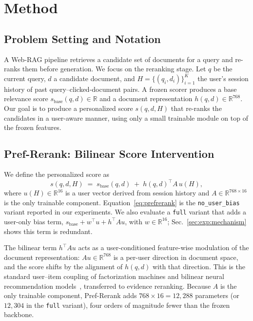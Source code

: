 \section{Method}
\label{sec:method}

\subsection{Problem Setting and Notation}

A Web-RAG pipeline retrieves a candidate set of documents for a query and re-ranks them before generation. We focus on the reranking stage. Let $q$ be the current query, $d$ a candidate document, and $H = \{(q_i, d_i)\}_{i=1}^{K}$ the user's session history of past query--clicked-document pairs. A frozen scorer produces a base relevance score $s_{\mathrm{base}}(q,d) \in \mathbb{R}$ and a document representation $h(q,d) \in \mathbb{R}^{768}$. Our goal is to produce a personalized score $s(q,d,H)$ that re-ranks the candidates in a user-aware manner, using only a small trainable module on top of the frozen features.

\subsection{Pref-Rerank: Bilinear Score Intervention}
\label{sec:method:intervention}

We define the personalized score as
\begin{equation}
\label{eq:prefrerank}
s(q,d,H) \;=\; s_{\mathrm{base}}(q,d) \;+\; h(q,d)^{\top} A\, u(H),
\end{equation}
where $u(H) \in \mathbb{R}^{16}$ is a user vector derived from session history and $A \in \mathbb{R}^{768 \times 16}$ is the only trainable component. Equation~\eqref{eq:prefrerank} is the \texttt{no\_user\_bias} variant reported in our experiments. We also evaluate a \texttt{full} variant that adds a user-only bias term, $s_{\mathrm{base}} + w^\top u + h^\top A u$, with $w \in \mathbb{R}^{16}$; Sec.~\ref{sec:exp:mechanism} shows this term is redundant.

The bilinear term $h^\top A u$ acts as a user-conditioned feature-wise modulation of the document representation: $A u \in \mathbb{R}^{768}$ is a per-user direction in document space, and the score shifts by the alignment of $h(q,d)$ with that direction. This is the standard user--item coupling of factorization machines and bilinear neural recommendation models~\cite{he2017nfm,xiao2017afm}, transferred to evidence reranking. Because $A$ is the only trainable component, Pref-Rerank adds $768 \times 16 = 12{,}288$ parameters (or $12{,}304$ in the \texttt{full} variant), four orders of magnitude fewer than the frozen backbone.


